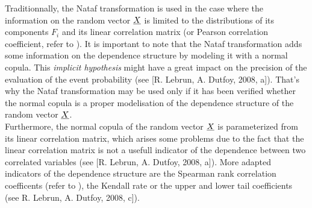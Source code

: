             {

              Traditionnally, the Nataf transformation is used in the case where the information on the random vector ${\underline{X}}$ is limited to the distributions of its components $F_i$ and its linear correlation matrix  (or Pearson correlation coefficient, refer to ). It is important to note that the Nataf transformation adds some information on the dependence structure by modeling it with a normal copula. This \emph{implicit hypothesis} might have a great impact on the precision of the evaluation of the event probability (see [R. Lebrun, A. Dutfoy, 2008, a]). That's why the Nataf transformation may be used only if it has been verified whether the normal copula is a proper modelisation of the dependence structure of the random vector ${\underline{X}}$. \\

              Furthermore, the normal copula of the random vector ${\underline{X}}$ is parameterized from its linear correlation matrix, which arises some problems due to the fact that the linear correlation matrix is not a usefull indicator of the dependence between two correlated variables (see [R. Lebrun, A. Dutfoy, 2008, a]). More adapted indicators of the dependence structure are the Spearman rank correlation coefficents (refer to ), the Kendall rate or the upper and lower tail coefficients (see R. Lebrun, A. Dutfoy, 2008, c]).\\


}
